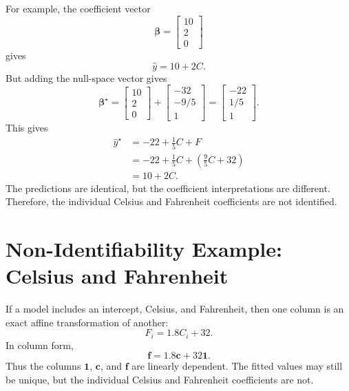 {For example, the coefficient vector
\begin{equation}
  \boldsymbol{\beta}=\begin{bmatrix}10\\2\\0\end{bmatrix}
\end{equation}
gives
\begin{equation}
  \widehat{y}=10+2C.
\end{equation}
But adding the null-space vector gives
\begin{equation}
  \boldsymbol{\beta}^{\star}
  =\begin{bmatrix}10\\2\\0\end{bmatrix}
  +\begin{bmatrix}-32\\-9/5\\1\end{bmatrix}
  =\begin{bmatrix}-22\\1/5\\1\end{bmatrix}.
\end{equation}
This gives
\begin{align}
  \widehat{y}^{\star}
  &=-22+\frac{1}{5}C+F \\
  &=-22+\frac{1}{5}C+\left(\frac{9}{5}C+32\right) \\
  &=10+2C.
\end{align}
The predictions are identical, but the coefficient interpretations are different.  Therefore, the individual Celsius and Fahrenheit coefficients are not identified.
}{
\section{Non-Identifiability Example: Celsius and Fahrenheit}

If a model includes an intercept, Celsius, and Fahrenheit, then one column is an exact affine transformation of another:
\begin{equation}
  F_i = 1.8C_i+32.
\end{equation}
In column form,
\begin{equation}
  \mathbf{f}=1.8\mathbf{c}+32\mathbf{1}.
\end{equation}
Thus the columns \(\mathbf{1}\), \(\mathbf{c}\), and \(\mathbf{f}\) are linearly dependent.  The fitted values may still be unique, but the individual Celsius and Fahrenheit coefficients are not.
}
